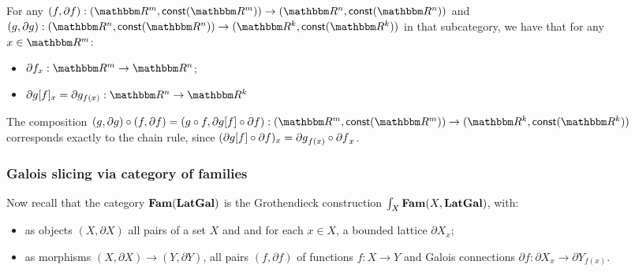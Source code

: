 For any $(f, \partial f): (\RR^m, \const(\RR^m)) \to (\RR^n, \const(\RR^n))$ and $(g, \partial g): (\RR^n,
\const(\RR^n)) \to (\RR^k, \const(\RR^k))$ in that subcategory, we have that for any $x \in \RR^m$:
\begin{itemize}
\item $\partial f_x: \RR^m \to \RR^n$;
\item $\reindex{\partial g}{f}_x = \partial g_{f(x)}: \RR^n \to \RR^k$
\end{itemize}

\noindent The composition $(g, \partial g) \comp (f, \partial f) = (g \comp f, \reindex{\partial g}{f} \comp
\partial f): (\RR^m, \const(\RR^m)) \to (\RR^k, \const(\RR^k))$ corresponds exactly to the chain rule, since
$(\partial g[f] \circ \partial f)_x = {\partial g}_{f(x)} \circ {\partial f}_x$.

\subsubsection{Galois slicing via category of families}

Now recall that the category $\mathbf{Fam}(\mathbf{LatGal})$ is the Grothendieck construction $\int_{X}\mathbf{Fam}(X,
\mathbf{LatGal})$, with:
\begin{itemize}
\item as objects $(X, \partial X)$ all pairs of a set $X$ and and for each $x \in X$, a bounded lattice
$\partial X_x$;
\item as morphisms $(X, \partial X) \to (Y, \partial Y)$, all pairs $(f, \partial f)$ of functions $f: X \to
Y$ and Galois connections $\partial f: \partial X_x \to \partial Y_{f(x)}$.
\end{itemize}
